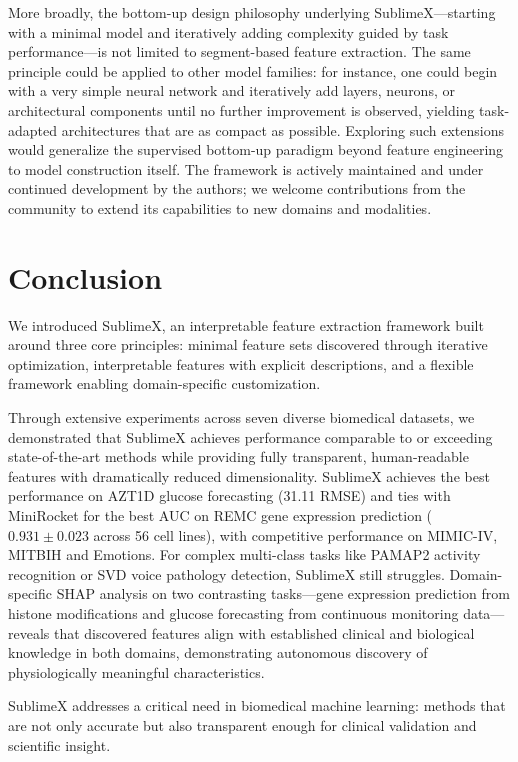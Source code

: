 \documentclass[times, review, 10pt]{elsarticle}
\begin{document}
More broadly, the bottom-up design philosophy underlying SublimeX---starting with a minimal model and iteratively adding complexity guided by task
performance---is not limited to segment-based feature extraction. The same principle could be applied to other model families: for instance, one could
begin with a very simple neural network and iteratively add layers, neurons, or architectural components until no further improvement is observed, yielding
task-adapted architectures that are as compact as possible. Exploring such extensions would generalize the supervised bottom-up paradigm beyond feature engineering to model construction itself.
The framework is actively maintained and under continued development by the authors; we welcome contributions from the community to
extend its capabilities to new domains and modalities. 

\section{Conclusion}
We introduced SublimeX, an interpretable feature extraction framework built around three core principles: minimal feature sets discovered
through iterative optimization, interpretable features with explicit descriptions, and a flexible framework enabling domain-specific customization.

Through extensive experiments across seven diverse biomedical datasets, we demonstrated that SublimeX achieves performance comparable to or exceeding
state-of-the-art methods while providing fully transparent, human-readable
features with dramatically reduced dimensionality. SublimeX achieves the best
performance on AZT1D glucose forecasting (31.11 RMSE) and ties with MiniRocket
for the best AUC on REMC gene expression prediction ($0.931 \pm 0.023$ across
56 cell lines), with competitive performance on MIMIC-IV, MITBIH and Emotions. 
For complex multi-class tasks like PAMAP2 activity recognition or SVD voice pathology detection, SublimeX still struggles. 
Domain-specific SHAP analysis on two contrasting tasks---gene
expression prediction from histone modifications and glucose
forecasting from continuous monitoring data---reveals that
discovered features align with established clinical and
biological knowledge in both domains, demonstrating autonomous
discovery of physiologically meaningful characteristics.

SublimeX addresses a critical need in biomedical machine learning: methods that
are not only accurate but also transparent enough for clinical validation and scientific insight. 
\end{document}
